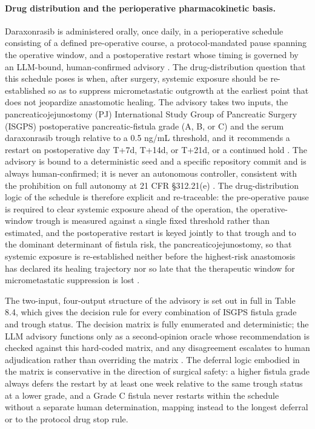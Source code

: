 \paragraph{Drug distribution and the perioperative pharmacokinetic basis.}
Daraxonrasib is administered orally, once daily, in a perioperative schedule
consisting of a defined pre-operative course, a protocol-mandated pause spanning
the operative window, and a postoperative restart whose timing is governed by an
LLM-bound, human-confirmed advisory \cite{onpremwhippl}. The drug-distribution
question that this schedule poses is when, after surgery, systemic exposure
should be re-established so as to suppress micrometastatic outgrowth at the
earliest point that does not jeopardize anastomotic healing. The advisory takes
two inputs, the pancreaticojejunostomy (PJ) International Study Group of
Pancreatic Surgery (ISGPS) postoperative pancreatic-fistula grade (A, B, or C)
and the serum daraxonrasib trough relative to a 0.5 ng/mL threshold, and it
recommends a restart on postoperative day T+7d, T+14d, or T+21d, or a continued
hold \cite{onpremwhippl}. The advisory is bound to a deterministic seed and a
specific repository commit and is always human-confirmed; it is never an
autonomous controller, consistent with the prohibition on full autonomy at 21
CFR \S 312.21(e) \cite{cfr312paiuni}. The drug-distribution logic of the schedule
is therefore explicit and re-traceable: the pre-operative pause is required to
clear systemic exposure ahead of the operation, the operative-window trough is
measured against a single fixed threshold rather than estimated, and the
postoperative restart is keyed jointly to that trough and to the dominant
determinant of fistula risk, the pancreaticojejunostomy, so that systemic
exposure is re-established neither before the highest-risk anastomosis has
declared its healing trajectory nor so late that the therapeutic window for
micrometastatic suppression is lost \cite{onpremwhippl,qspmetpancre}.

The two-input, four-output structure of the advisory is set out in full in Table
8.4, which gives the decision rule for every combination of ISGPS fistula grade
and trough status. The decision matrix is fully enumerated and deterministic;
the LLM advisory functions only as a second-opinion oracle whose recommendation
is checked against this hard-coded matrix, and any disagreement escalates to
human adjudication rather than overriding the matrix \cite{onpremwhippl,clintrustpai}.
The deferral logic embodied in the matrix is conservative in the direction of
surgical safety: a higher fistula grade always defers the restart by at least one
week relative to the same trough status at a lower grade, and a Grade C fistula
never restarts within the schedule without a separate human determination, mapping
instead to the longest deferral or to the protocol drug stop rule.



